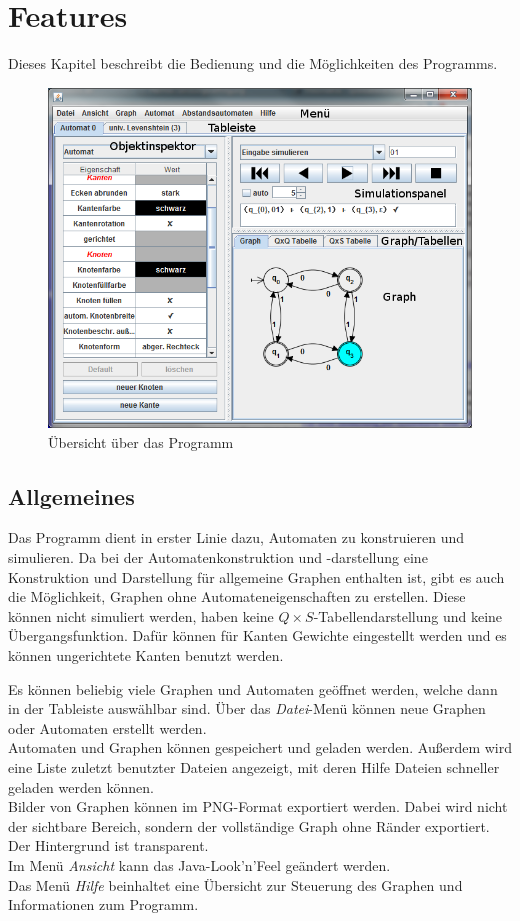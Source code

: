 \chapter{Features}\label{Features}
Dieses Kapitel beschreibt die Bedienung und die Möglichkeiten des Programms.
\begin{figure}[htbp]
\centering
\includegraphics[width=\linewidth,height=\textheight,keepaspectratio]{pic/screenshots/all-text}%
\caption{Übersicht über das Programm}%
\end{figure}
\section{Allgemeines}
Das Programm dient in erster Linie dazu, Automaten zu konstruieren und simulieren. Da bei der Automatenkonstruktion und -darstellung eine Konstruktion und Darstellung für allgemeine Graphen enthalten ist, gibt es auch die Möglichkeit, Graphen ohne Automateneigenschaften zu erstellen. Diese können nicht simuliert werden, haben keine $Q \times S$-Tabellendarstellung und keine Übergangsfunktion. Dafür können für Kanten Gewichte eingestellt werden und es können ungerichtete Kanten benutzt werden.

Es können beliebig viele Graphen und Automaten geöffnet werden, welche dann in der Tableiste auswählbar sind.
Über das \textit{Datei}-Menü können neue Graphen oder Automaten erstellt werden.\\
Automaten und Graphen können gespeichert und geladen werden. Außerdem wird eine Liste zuletzt benutzter Dateien angezeigt, mit deren Hilfe Dateien schneller geladen werden können.\\
Bilder von Graphen können im PNG-Format exportiert werden. Dabei wird nicht der sichtbare Bereich, sondern der vollständige Graph ohne Ränder exportiert. Der Hintergrund ist transparent.\\
Im Menü \textit{Ansicht} kann das Java-Look'n'Feel geändert werden.\\
Das Menü \textit{Hilfe} beinhaltet eine Übersicht zur Steuerung des Graphen und Informationen zum Programm.

